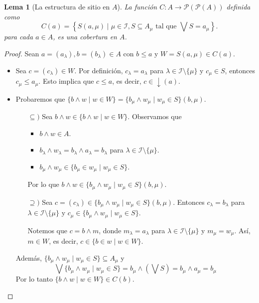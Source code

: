 \documentclass[12pt,letterpaper,titlepage]{article}
\newtheorem{lemma}{Lema}
\theoremstyle{definition}
\newcommand\Sup{\bigvee}
\newcommand\down{{\downarrow}}
\renewcommand\inf{\wedge}
\renewcommand\cal[1]{\mathcal{#1}}
\newcommand\scr[1]{\mathscr{#1}}
\newcommand\<{\langle}
\renewcommand\>{\rangle}
\begin{document}
\begin{lemma}[La estructura de sitio en $A$]
    La función $C:A\to\cal P(\cal P(A))$
    definida como
    \[
        C(a)
        =\left\{ S(a,\mu)
        \mid \mu\in\scr I, S\subseteq A_\mu
        \text{ tal que }\Sup S=a_\mu\right \}.
    \]
    para cada $a\in A$, es una cobertura en $A$.
\end{lemma}
\begin{proof}
    Sean $a=(a_\lambda),b=(b_\lambda)\in A$ con $b\leq a$ y $W=S(a,\mu)\in C(a)$.
    \begin{itemize}
    \item Sea $c=(c_\lambda)\in W$. Por definición, $c_\lambda=a_\lambda$ para $\lambda\in \scr I\setminus\{\mu\}$ y $c_\mu \in S$, entonces $c_\mu\leq a_\mu$. Esto implica que $c\leq a$, es decir, $c\in \down(a)$.
    \end{itemize}
    
    \begin{itemize}
    \item Probaremos que $\{b\inf w\mid w\in W\}=\{b_\mu \inf w_\mu\mid w_\mu\in S\}(b,\mu)$.\par 
    \begin{itemize}
    \item[$\subseteq)$] Sea $b\inf w\in\{b\inf w\mid w\in W\}$. Observamos que 
    \begin{itemize}
    \item $b\inf w\in A$.
    \item $b_\lambda\inf w_\lambda=b_\lambda\inf a_\lambda=b_\lambda$ para $\lambda\in\scr I\setminus \{\mu\}$.
    \item $b_\mu\inf w_\mu\in\{b_\mu\in w_\mu\mid w_\mu\in S\}$.
    \end{itemize}
    Por lo que $b\inf w\in \{b_\mu \inf w_\mu\mid w_\mu\in S\}(b,\mu)$.
    \item[$\supseteq)$] Sea $c=(c_\lambda) \in \{b_\mu \inf w_\mu\mid w_\mu\in S\}(b,\mu)$. Entonces $c_\lambda=b_\lambda$ para $\lambda\in\scr I\setminus\{\mu\}$ y $c_\mu\in \{b_\mu \inf w_\mu\mid w_\mu\in S\}$.\par 
    Notemos que $c=b\inf m$, donde $m_\lambda=a_\lambda$ para $\lambda\in\scr I\setminus \{\mu\}$ y $m_\mu=w_\mu$. Así, $m\in W$, es decir, $c\in\{b\in w\mid w\in W\}$.
    \end{itemize}
    Además, $\{b_\mu \inf w_\mu\mid w_\mu\in S\}\subseteq A_\mu$ y
    \[\Sup\{b_\mu \inf w_\mu\mid w_\mu\in S\}=b_\mu\inf \left(\Sup S\right)=b_\mu\inf a_\mu=b_\mu\]
    Por lo tanto $\{b\inf w\mid w\in W\}\in C(b)$.
    \end{itemize}
\end{proof}
\end{document}
